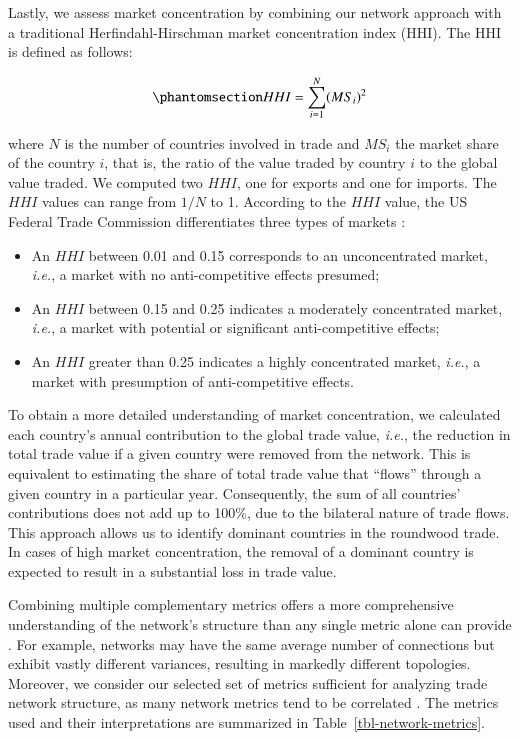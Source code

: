 \documentclass[
  authoryear,
  review,
  3p]{elsarticle}
\providecommand{\tightlist}{%
  \setlength{\itemsep}{0pt}\setlength{\parskip}{0pt}}
\begin{document}
Lastly, we assess market concentration by combining our network approach
with a traditional Herfindahl-Hirschman market concentration index
(HHI). The HHI is defined as follows:

\begin{equation}\phantomsection\label{eq-HHI}{
HHI = \sum^{N}_{i = 1} (MS_{i})^{2}
}\end{equation}

where \(N\) is the number of countries involved in trade and \(MS_{i}\)
the market share of the country \(i\), that is, the ratio of the value
traded by country \(i\) to the global value traded. We computed two
\(HHI\), one for exports and one for imports. The \(HHI\) values can
range from \(1/N\) to 1. According to the \(HHI\) value, the US Federal
Trade Commission differentiates three types of markets
\citep{doj2010horizontal}:

\begin{itemize}
\tightlist
\item
  An \(HHI\) between 0.01 and 0.15 corresponds to an unconcentrated
  market, \emph{i.e.}, a market with no anti-competitive effects
  presumed;
\item
  An \(HHI\) between 0.15 and 0.25 indicates a moderately concentrated
  market, \emph{i.e.}, a market with potential or significant
  anti-competitive effects;
\item
  An \(HHI\) greater than 0.25 indicates a highly concentrated market,
  \emph{i.e.}, a market with presumption of anti-competitive effects.
\end{itemize}

To obtain a more detailed understanding of market concentration, we
calculated each country's annual contribution to the global trade value,
\emph{i.e.}, the reduction in total trade value if a given country were
removed from the network. This is equivalent to estimating the share of
total trade value that ``flows'' through a given country in a particular
year. Consequently, the sum of all countries' contributions does not add
up to 100\%, due to the bilateral nature of trade flows. This approach
allows us to identify dominant countries in the roundwood trade. In
cases of high market concentration, the removal of a dominant country is
expected to result in a substantial loss in trade value.

Combining multiple complementary metrics offers a more comprehensive
understanding of the network's structure than any single metric alone
can provide \citep{shanafelt2017yourself, salau2022taking}. For example,
networks may have the same average number of connections but exhibit
vastly different variances, resulting in markedly different topologies.
Moreover, we consider our selected set of metrics sufficient for
analyzing trade network structure, as many network metrics tend to be
correlated \citep{baggio2011landscape}. The metrics used and their
interpretations are summarized in Table~\ref{tbl-network-metrics}.
\end{document}
